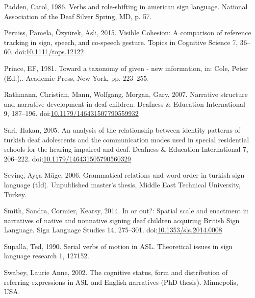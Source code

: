 \documentclass[]{elsarticle} %
\newlength{\cslhangindent}
\newenvironment{CSLReferences}[2] %
 {%
  \setlength{\parindent}{0pt}
  \ifodd #1 \everypar{\setlength{\hangindent}{\cslhangindent}}\ignorespaces\fi
  \ifnum #2 > 0
  \setlength{\parskip}{#2\baselineskip}
  \fi
 }%
 {}
\begin{document}
\begin{CSLReferences}{1}{0}
\leavevmode{}%
Padden, Carol, 1986. Verbs and role-shifting in american sign language.
National Association of the Deaf Silver Spring, MD, p. 57.

\leavevmode{}%
Perniss, Pamela, Özyürek, Asli, 2015. Visible Cohesion: A comparison of
reference tracking in sign, speech, and co-speech gesture. Topics in
Cognitive Science 7, 36--60.
doi:\href{https://doi.org/10.1111/tops.12122}{10.1111/tops.12122}

\leavevmode{}%
Prince, EF, 1981. Toward a taxonomy of given - new information, in:
Cole, Peter (Ed.),. Academic Press, New York, pp. 223--255.

\leavevmode{}%
Rathmann, Christian, Mann, Wolfgang, Morgan, Gary, 2007. Narrative
structure and narrative development in deaf children. Deafness \&
Education International 9, 187--196.
doi:\href{https://doi.org/10.1179/146431507790559932}{10.1179/146431507790559932}

\leavevmode{}%
Sari, Hakan, 2005. An analysis of the relationship between identity
patterns of turkish deaf adolescents and the communication modes used in
special residential schools for the hearing impaired and deaf. Deafness
\& Education International 7, 206--222.
doi:\href{https://doi.org/10.1179/146431505790560329}{10.1179/146431505790560329}

\leavevmode{}%
Sevinç, Ayça Müge, 2006. Grammatical relations and word order in turkish
sign language (t{İ}d). Unpublished master's thesis, Middle East
Technical University, Turkey.

\leavevmode{}%
Smith, Sandra, Cormier, Kearsy, 2014. In or out?: Spatial scale and
enactment in narratives of native and nonnative signing deaf children
acquiring British Sign Language. Sign Language Studies 14, 275--301.
doi:\href{https://doi.org/10.1353/sls.2014.0008}{10.1353/sls.2014.0008}

\leavevmode{}%
Supalla, Ted, 1990. Serial verbs of motion in ASL. Theoretical issues in
sign language research 1, 127152.

\leavevmode{}%
Swabey, Laurie Anne, 2002. The cognitive status, form and distribution
of referring expressions in ASL and English narratives (PhD thesis).
Minnepolis, USA.


\end{CSLReferences}
\end{document}
